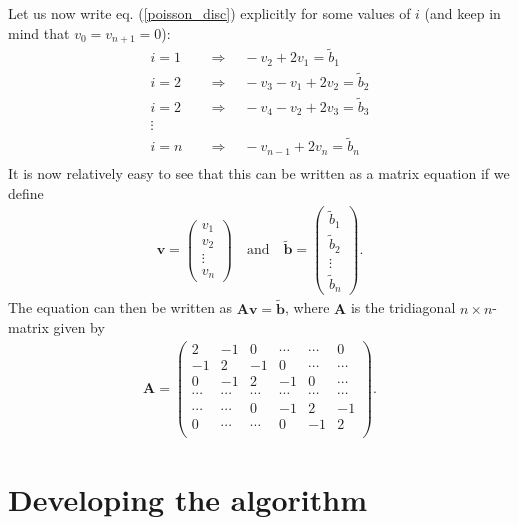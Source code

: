 \documentclass[12pt, a4paper]{article}
\begin{document}
Let us now write eq. (\ref{poisson_disc}) explicitly for some values of $i$ (and keep in mind that 
$v_0 = v_{n+1} = 0$): 
\begin{align*}
i = 1 \quad & \Rightarrow \quad -v_2 + 2v_1 = \tilde{b}_1 \\ 
i = 2 \quad & \Rightarrow \quad -v_3 - v_1 + 2v_2 = \tilde{b}_2 \\ 
i = 2 \quad & \Rightarrow \quad -v_4 - v_2 + 2v_3 = \tilde{b}_3 \\ 
\vdots \\
i = n \quad & \Rightarrow \quad  - v_{n-1} + 2v_n = \tilde{b}_n \\ 
\end{align*}
It is now relatively easy to see that this can be written as a matrix equation if we define 
\begin{align*}
\mathbf{v} = \left( \begin{array}{c}
v_1 \\ v_2 \\ \vdots \\ v_n
\end{array} \right) 
\quad \mbox{and} \quad
\mathbf{\tilde{b}} = \left( \begin{array}{c}
\tilde{b}_1 \\ \tilde{b}_2 \\ \vdots \\ \tilde{b}_n 
\end{array} \right) . 
\end{align*}
The equation can then be written as $\mathbf{Av} = \mathbf{\tilde{b}}$, where $\mathbf{A}$ is the 
tridiagonal $n\times n$-matrix given by 
\begin{align*}
\mathbf{A} = \left(\begin{array}{cccccc}
2 & -1 & 0 & \cdots & \cdots & 0 \\ 
-1 & 2 & -1 & 0 & \cdots & \cdots \\ 
0 & -1 & 2 & -1 & 0 & \cdots \\
\cdots & \cdots & \cdots & \cdots & \cdots & \cdots \\              
\cdots & \cdots  & 0 & -1 & 2 & -1 \\ 
0 & \cdots & \cdots & 0 & -1 & 2 \\  
\end{array} \right). 
\end{align*}

\section{Developing the algorithm}
\end{document}
